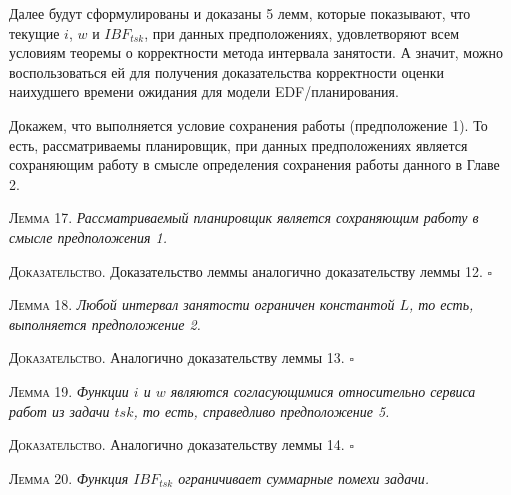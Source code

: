 \documentclass[14pt]{matmex-diploma-custom}
\begin{document}
Далее будут сформулированы и доказаны 5 лемм, которые показывают, что 
  текущие $i$, $w$ и $IBF_{tsk}$, при данных предположениях, удовлетворяют всем условиям 
  теоремы о корректности метода интервала занятости. А значит, можно воспользоваться ей  
  для получения доказательства корректности оценки наихудшего времени ожидания для модели EDF\-/планирования.

Докажем, что выполняется условие сохранения работы (предположение 1). 
  То есть, рассматриваемы планировщик, при данных предположениях является 
  сохраняющим работу в смысле определения сохранения работы данного в Главе 2.

\textsc{Лемма 17.}
\textit{Рассматриваемый планировщик является сохраняющим работу в смысле предположения 1.}
 
\textsc{Доказательство.} Доказательство леммы аналогично доказательству леммы 12. $\square$


\textsc{Лемма 18.}
\textit{Любой интервал занятости ограничен константой $L$, то есть, выполняется предположение 2. }

\textsc{Доказательство.} Аналогично доказательству леммы 13. $\square$


\textsc{Лемма 19.}
\textit{Функции $i$ и $w$ являются согласующимися относительно сервиса 
  работ из задачи $tsk$, то есть, справедливо предположение 5. }

\textsc{Доказательство.} Аналогично доказательству леммы 14. $\square$


\textsc{Лемма 20.}
\textit{Функция $IBF_{tsk}$ ограничивает суммарные помехи задачи. }
\end{document}
